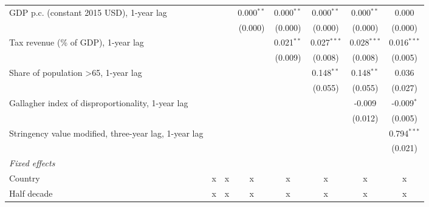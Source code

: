 \begin{table}[htbp]
\begin{tabular}{lccccccc}
      GDP p.c. (constant 2015 USD), 1-year lag                          &               &               & 0.000$^{**}$  & 0.000$^{**}$   & 0.000$^{**}$   & 0.000$^{**}$   & 0.000\\   
                                                                        &               &               & (0.000)       & (0.000)        & (0.000)        & (0.000)        & (0.000)\\   
      Tax revenue (\% of GDP), 1-year lag                               &               &               &               & 0.021$^{**}$   & 0.027$^{***}$  & 0.028$^{***}$  & 0.016$^{***}$\\   
                                                                        &               &               &               & (0.009)        & (0.008)        & (0.008)        & (0.005)\\   
      Share of population >65, 1-year lag                               &               &               &               &                & 0.148$^{**}$   & 0.148$^{**}$   & 0.036\\   
                                                                        &               &               &               &                & (0.055)        & (0.055)        & (0.027)\\   
      Gallagher index of disproportionality, 1-year lag                 &               &               &               &                &                & -0.009         & -0.009$^{*}$\\   
                                                                        &               &               &               &                &                & (0.012)        & (0.005)\\   
      Stringency value modified, three-year lag, 1-year lag             &               &               &               &                &                &                & 0.794$^{***}$\\   
                                                                        &               &               &               &                &                &                & (0.021)\\   
      \emph{Fixed effects}\\
      Country                                                           & x             & x             & x             & x              & x              & x              & x\\  
      Half decade                                                       & x             & x             & x             & x              & x              & x              & x\\  

\end{tabular}
\end{table}
